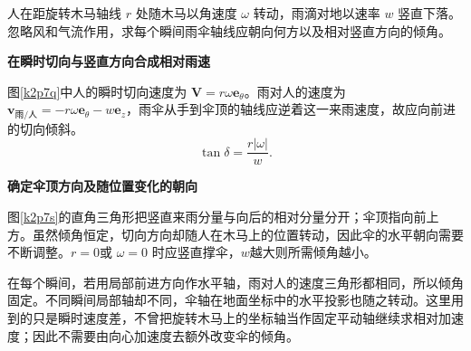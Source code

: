 \begin{question}\begin{example}[旋转木马上的雨伞]\label{k2p7}
人在距旋转木马轴线 $r$ 处随木马以角速度 $\omega$ 转动，雨滴对地以速率 $w$ 竖直下落。忽略风和气流作用，求每个瞬间雨伞轴线应朝向何方以及相对竖直方向的倾角。\end{example}
\end{question}
\begin{solution}\textbf{在瞬时切向与竖直方向合成相对雨速}\par\nobreak
图\ref{k2p7q}中人的瞬时切向速度为 $\bm V=r\omega\bm e_\theta$。雨对人的速度为 $\bm v_{\text{雨/人}}=-r\omega\bm e_\theta-w\bm e_z$，雨伞从手到伞顶的轴线应逆着这一来雨速度，故应向前进的切向倾斜。
\[\boxed{\tan\delta=\frac{r|\omega|}{w}}.\]



\par\medskip{}\noindent\textbf{确定伞顶方向及随位置变化的朝向}\par\nobreak
图\ref{k2p7s}的直角三角形把竖直来雨分量与向后的相对分量分开；伞顶指向前上方。虽然倾角恒定，切向方向却随人在木马上的位置转动，因此伞的水平朝向需要不断调整。$r=0$或 $\omega=0$ 时应竖直撑伞，$w$越大则所需倾角越小。

在每个瞬间，若用局部前进方向作水平轴，雨对人的速度三角形都相同，所以倾角固定。不同瞬间局部轴却不同，伞轴在地面坐标中的水平投影也随之转动。这里用到的只是瞬时速度差，不曾把旋转木马上的坐标轴当作固定平动轴继续求相对加速度；因此不需要由向心加速度去额外改变伞的倾角。\end{solution}

